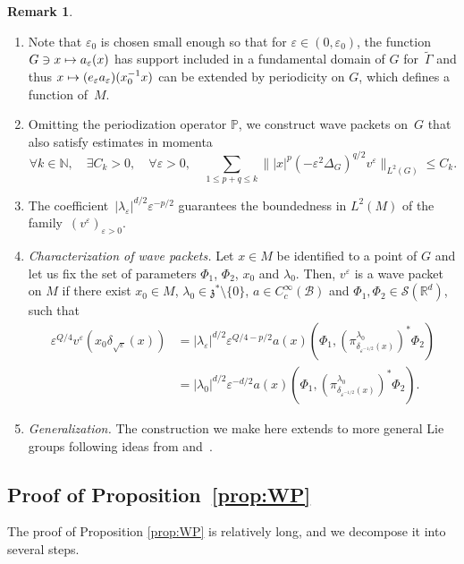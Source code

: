 \documentclass[10pt]{amsart}
\let\mathcal\mathscr
\newcommand\mto{\mathchoice{\longmapsto}{\mapsto}{\mapsto}{\mapsto}}
\theoremstyle{plain}
\theoremstyle{definition}
\newtheorem{remark}[theorem]{Remark}
\let\eps\varepsilon
\def\R{{\mathbb R}}
\def\N{{\mathbb N}}
\def\bbP{{\mathbb P}}
\providecommand{\skpt}{\par\smallskip\noindent}
\begin{document}
\skpt
\begin{remark}\label{rem:toto}
\begin{enumerate}
\item Note that $\eps_0$ is chosen small enough so that for $\eps\in(0,\eps_0)$, the function \hbox{$G\ni x\mto a_\eps(x)$} has support included in a fundamental domain of $G$ for~$\widetilde{\Gamma}$ and thus $x\mto (e_\eps a_\eps)(x_0^{-1}x)$ can be extended by periodicity on $G$, which defines a function of~$M$.
\item Omitting the periodization operator $\bbP$, we construct wave packets on~$G$ that also satisfy estimates in momenta
\[
\forall k\in\N,\quad \exists C_k>0,\quad \forall \eps>0,\quad \sum_{1\leq p+q\leq k} \| |x|^p (-\eps^2\Delta_G)^{q/2} v^\eps\|_{L^2(G)}\leq C_k.
\]
\item The coefficient~$|\lambda_\eps|^{d/2}\eps^{-p/2}$ guarantees the boundedness in $L^2(M)$ of the family~$(v^\eps)_{\eps>0}$.
\item \emph{Characterization of wave packets.} Let
$x\in M$ be identified to a point of $G$ and let us fix the set of parameters $\Phi_1$, $\Phi_2$, $x_0$ and $\lambda_0$. Then, $v^\eps$ is a wave packet on $M$ if there exist $x_0\in M$, $\lambda_0\in\mathfrak z^*\setminus\{0\}$, $a\in C_c^\infty(\mathcal B)$ and $\Phi_1,\Phi_2\in \mathcal S(\R^d)$, such that
\begin{equation}\label{e:carac}
\begin{aligned}
\eps^{Q/4} v^\eps(x_0\delta_{\sqrt\eps} (x)) & =|\lambda_\eps| ^{d/2} \eps^{Q/4-p/2}a(x) (\Phi_1, (\pi^{\lambda_0} _{\delta_{\eps^{-1/2} }(x)})^*\Phi_2)\\
&= |\lambda_0|^{d/2} \eps^{-d/2}a(x) (\Phi_1, (\pi^{\lambda_0} _{\delta_{\eps^{-1/2} }(x)})^*\Phi_2).
\end{aligned}
\end{equation}
\item \emph{Generalization.} The construction we make here extends to more general Lie groups following ideas from \cite[\S6.4]{FF1} and~\cite{pedersen}.
\end{enumerate}
\end{remark}

\subsection{Proof of Proposition~\ref{prop:WP}} The proof of Proposition \ref{prop:WP} is relatively long, and we decompose it into several steps.
\end{document}

